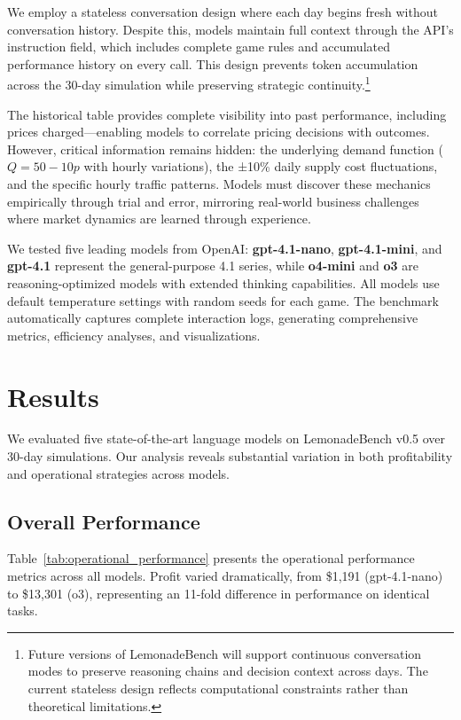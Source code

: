 \documentclass[11pt]{article}
\begin{document}
We employ a stateless conversation design where each day begins fresh without conversation history. Despite this, models maintain full context through the API's instruction field, which includes complete game rules and accumulated performance history on every call. This design prevents token accumulation across the 30-day simulation while preserving strategic continuity.\footnote{Future versions of LemonadeBench will support continuous conversation modes to preserve reasoning chains and decision context across days. The current stateless design reflects computational constraints rather than theoretical limitations.}

The historical table provides complete visibility into past performance, including prices charged—enabling models to correlate pricing decisions with outcomes. However, critical information remains hidden: the underlying demand function ($Q = 50 - 10p$ with hourly variations), the ±10\% daily supply cost fluctuations, and the specific hourly traffic patterns. Models must discover these mechanics empirically through trial and error, mirroring real-world business challenges where market dynamics are learned through experience.

We tested five leading models from OpenAI: \textbf{gpt-4.1-nano}, \textbf{gpt-4.1-mini}, and \textbf{gpt-4.1} represent the general-purpose 4.1 series, while \textbf{o4-mini} and \textbf{o3} are reasoning-optimized models with extended thinking capabilities. All models use default temperature settings with random seeds for each game. The benchmark automatically captures complete interaction logs, generating comprehensive metrics, efficiency analyses, and visualizations.

\section{Results}

We evaluated five state-of-the-art language models on LemonadeBench v0.5 over 30-day simulations. Our analysis reveals substantial variation in both profitability and operational strategies across models.

\subsection{Overall Performance}

Table~\ref{tab:operational_performance} presents the operational performance metrics across all models. Profit varied dramatically, from \$1,191 (gpt-4.1-nano) to \$13,301 (o3), representing an 11-fold difference in performance on identical tasks.
\end{document}
